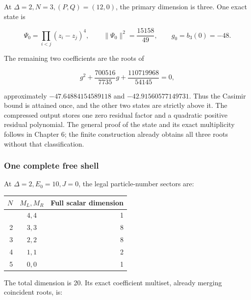 At \(\Delta=2,N=3,(P,Q)=(12,0)\), the primary dimension is three. One exact state is

\[
\Psi_0=\prod_{i<j}(z_i-z_j)^4,\qquad
\|\Psi_0\|^2=\frac{15158}{49},\qquad g_0=b_3(0)=-48.
\tag{5.31}
\]

The remaining two coefficients are the roots of

\[
g^2+\frac{700516}{7735}g+\frac{110719968}{54145}=0,
\tag{5.32}
\]

approximately \(-47.64884154589118\) and \(-42.91560577149731\). Thus the Casimir bound is attained once, and the other two states are strictly above it. The compressed output stores one zero residual factor and a quadratic positive residual polynomial. The general proof of the state and its exact multiplicity follows in Chapter 6; the finite construction already obtains all three roots without that classification.

\hypertarget{one-complete-free-shell}{%
\subsubsection{One complete free shell}\label{one-complete-free-shell}}

At \(\Delta=2,E_0=10,J=0\), the legal particle-number sectors are:

\begin{longtable}[]{@{}rcr@{}}
\toprule\noalign{}
\(N\) & \(M_L,M_R\) & Full scalar dimension \\
\midrule\noalign{}
\endhead
\bottomrule\noalign{}
\endlastfoot
1 & \(4,4\) & 1 \\
2 & \(3,3\) & 8 \\
3 & \(2,2\) & 8 \\
4 & \(1,1\) & 2 \\
5 & \(0,0\) & 1 \\
\end{longtable}

The total dimension is 20. Its exact coefficient multiset, already merging coincident roots, is:

